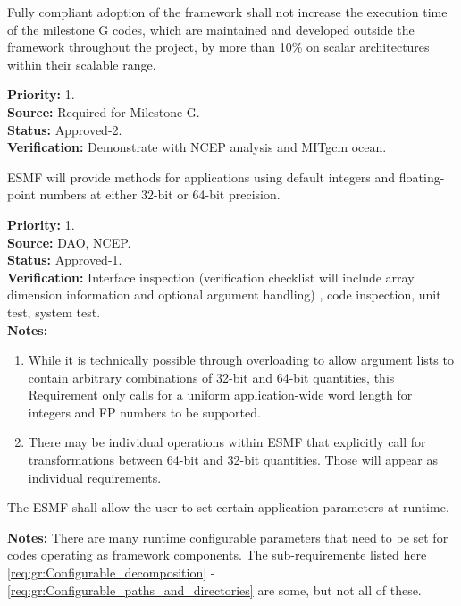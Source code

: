  \label{perf}
Fully compliant adoption of the framework shall not increase the execution time 
of the milestone G codes, which are maintained and developed outside the 
framework throughout the project, by more than 10\% on scalar 
architectures within their scalable range.
\begin{reqlist}
{\bf Priority:} 1. \\
{\bf Source:} Required for Milestone G. \\
{\bf Status:} Approved-2. \\
{\bf Verification:} Demonstrate with NCEP analysis and MITgcm ocean.
\end{reqlist}

 ESMF will provide methods for applications using
default integers and floating-point numbers at either 32-bit or 64-bit
precision.

\begin{reqlist}
  {\bf Priority:} 1. \\
  {\bf Source:} DAO, NCEP. \\
  {\bf Status:} Approved-1. \\
  {\bf Verification:} Interface inspection (verification 
  checklist will include array dimension information and
  optional argument handling) , code inspection, unit
  test, system test. \\
  {\bf Notes:}
  \begin{enumerate}
  \item While it is technically possible through overloading to allow
    argument lists to contain arbitrary combinations of 32-bit and
    64-bit quantities, this Requirement only calls for a uniform
    application-wide word length for integers and FP numbers to be
    supported.
  \item There may be individual operations within ESMF that explicitly
    call for transformations between 64-bit and 32-bit quantities.
    Those will appear as individual requirements.
  \end{enumerate}
\end{reqlist}

 The ESMF shall allow the user to set
certain application parameters at runtime.
\begin{reqlist}
{\bf Notes:} There are many runtime configurable parameters that 
need to be set for codes operating as framework components.
The sub-requiremente listed here \ref{req:gr:Configurable_decomposition} - 
\ref{req:gr:Configurable_paths_and_directories} are some, but not all of these.
\end{reqlist}

